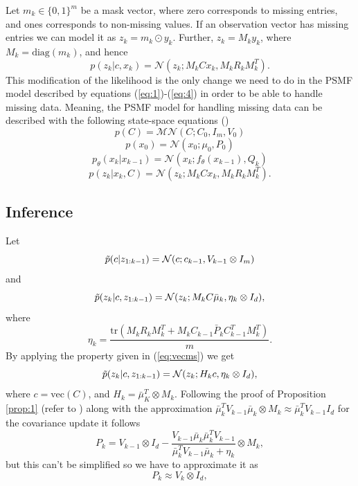 \documentclass{mldsmsc}
\begin{document}
Let $m_k \in \{0,1\}^m$ be a mask vector, where zero corresponds to missing entries, and ones corresponds to non-missing values. If an observation vector has missing entries we can model it as $z_k = m_k \odot y_k$. Further, $z_k = M_k y_k$, where $M_k = \text{diag}(m_k)$, and hence
\begin{equation}
    p(z_k | c, x_k) = \mathcal{N}(z_k; M_k Cx_k, M_k R_k M_{k}^{T}).
\end{equation}
This modification of the likelihood is the only change we need to do in the PSMF model described by equations (\ref{eq:1})-(\ref{eq:4}) in order to be able to handle missing data. Meaning, the PSMF model for handling missing data can be described with the following state-space equations (\cite{akyildiz2021probabilistic})
\begin{equation}
    p(C) = \mathcal{MN}(C; C_0, I_m, V_0)
\end{equation}
\begin{equation}
    p(x_0) = \mathcal{N}(x_0; \mu_0, P_0)
\end{equation}
\begin{equation}
    p_{\theta}(x_k | x_{k-1}) = \mathcal{N}(x_k; f_{\theta}(x_{k-1}), Q_k)
\end{equation}
\begin{equation}
    p(z_k | x_k, C) = \mathcal{N}(z_k; M_k Cx_k, M_k R_k M_{k}^{T}).
\end{equation}

\subsection{Inference}

Let
\begin{equation}
    \Tilde{p}(c | z_{1:k-1}) = \mathcal{N}(c; c_{k-1}, V_{k-1} \otimes I_m)
\end{equation}
and 
\begin{equation}
    \Tilde{p}(z_k | c, z_{1:k-1}) = \mathcal{N}(z_k; M_k C \bar{\mu}_k, \eta_k \otimes I_d), 
\end{equation}
where 
\begin{equation}
    \eta_k = \frac{\text{tr}(M_k R_k M_k^T + M_k C_{k-1} \bar{P}_k C_{k-1}^T M_k^T)}{m}.
\end{equation}
By applying the property given in (\ref{eq:vecms}) we get
\begin{equation}
    \Tilde{p}(z_k | c, z_{1:k-1}) = \mathcal{N}(z_k; H_k c, \eta_k \otimes I_d),
\end{equation}
where $c = \text{vec}(C)$, and $H_k = \bar{\mu}_K^T \otimes M_k$. Following the proof of Proposition \ref{prop:1} (refer to \cite{akyildiz2021probabilistic}) along with the approximation $\bar{\mu}_k^T V_{k-1} \bar{\mu}_k \otimes M_k \approx \bar{\mu}_k^T V_{k-1} I_d$ for the covariance update it follows
\begin{equation}
    P_k = V_{k-1} \otimes I_d - \frac{V_{k-1} \bar{\mu}_k \bar{\mu}_k^T V_{k-1}}{\bar{\mu}_k^T V_{k-1} \bar{\mu}_k + \eta_k} \otimes M_k,
\end{equation}
but this can't be simplified so we have to approximate it as
\begin{equation}
    P_k \approx V_k \otimes I_d,
\end{equation}
\end{document}

